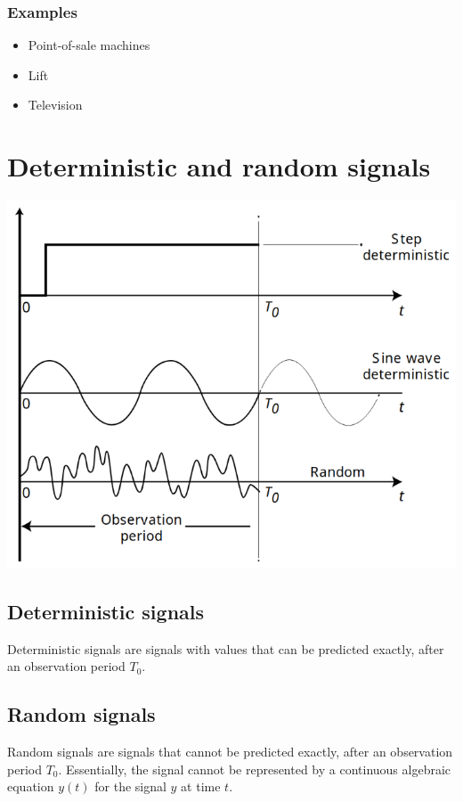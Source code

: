 \documentclass[11pt]{article}
\begin{document}
\subsubsection{Examples}
\label{sec:orgc4f6aeb}
\begin{itemize}
\item Point-of-sale machines
\item Lift
\item Television
\end{itemize}

 \newpage
\section{Deterministic and random signals}
\label{sec:org6346913}
\begin{center}
\includegraphics[scale=0.9]{./images/deterministic-vs-random-signals.png}
\end{center}
\subsection{Deterministic signals}
\label{sec:org9b41a51}
Deterministic signals are signals with values that can be predicted exactly, after an observation period \(T_0\).
\subsection{Random signals}
\label{sec:org06783dd}
Random signals are signals that cannot be predicted exactly, after an observation period \(T_0\). Essentially, the signal cannot be represented by a continuous algebraic equation \(y(t)\) for the signal \(y\) at time \(t\).
\end{document}
